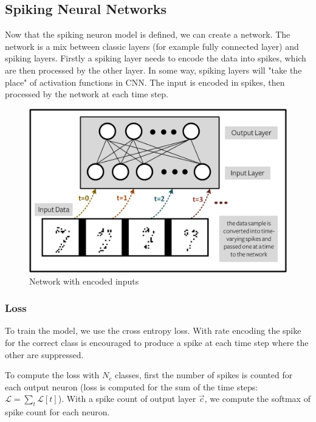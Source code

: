 \documentclass[11pt]{article}
\begin{document}
\subsection{Spiking Neural Networks}



Now that the spiking neuron model is defined, we can create a network. The network is a mix between classic layers (for example fully connected layer) and spiking layers. Firstly a spiking layer needs to encode the data into spikes, which are then processed by the other layer. In some way, spiking layers will "take the place" of activation functions in CNN.
The input is encoded in spikes, then processed by the network at each time step.


\begin{figure}[H]
  \begin{center}
    \includegraphics[width=\textwidth]{./image/input_network.png}
    \caption{Network with encoded inputs}
    \label{fig:input_network}
  \end{center}
\end{figure}




\hfill


\subsubsection{Loss}
To train the model, we use the cross entropy loss. With rate encoding the spike for the correct class is encouraged to produce a spike at each time step where the other are suppressed. 

To compute the loss with $N_c$ classes, first the number of spikes is counted for each output neuron (loss is computed for the sum of the time steps: $\mathcal{L} =\sum_{t}{\mathcal{L}[t]}$). With a spike count of output layer $\vec{c}$, we compute the softmax of spike count for each neuron.
\end{document}
